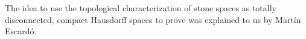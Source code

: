 The idea to use the topological characterization of stone spaces as totally disconnected, compact Hausdorff spaces to prove  was explained to us by Martín Escardó.
